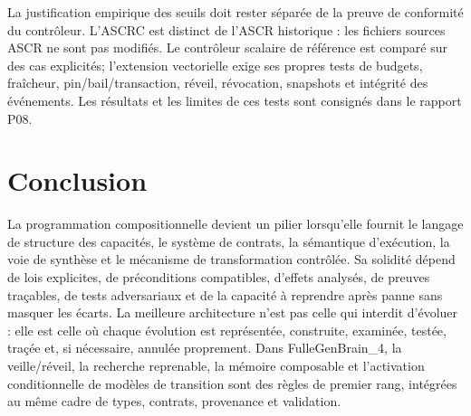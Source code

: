 \documentclass[11pt,a4paper]{article}
\theoremstyle{definition}
\theoremstyle{plain}
\theoremstyle{remark}
\begin{document}
La justification empirique des seuils doit rester séparée de la preuve de conformité du contrôleur. L'ASCRC est distinct de l'ASCR historique : les fichiers sources ASCR ne sont pas modifiés. Le contrôleur scalaire de référence est comparé sur des cas explicités; l'extension vectorielle exige ses propres tests de budgets, fraîcheur, pin/bail/transaction, réveil, révocation, snapshots et intégrité des événements. Les résultats et les limites de ces tests sont consignés dans le rapport P08.

\section{Conclusion}
La programmation compositionnelle devient un pilier lorsqu'elle fournit le langage de structure des capacités, le système de contrats, la sémantique d'exécution, la voie de synthèse et le mécanisme de transformation contrôlée. Sa solidité dépend de lois explicites, de préconditions compatibles, d'effets analysés, de preuves traçables, de tests adversariaux et de la capacité à reprendre après panne sans masquer les écarts. La meilleure architecture n'est pas celle qui interdit d'évoluer : elle est celle où chaque évolution est représentée, construite, examinée, testée, traçée et, si nécessaire, annulée proprement. Dans FulleGenBrain\_4, la veille/réveil, la recherche reprenable, la mémoire composable et l'activation conditionnelle de modèles de transition sont des règles de premier rang, intégrées au même cadre de types, contrats, provenance et validation.
\end{document}
